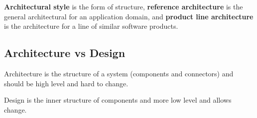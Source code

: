 \documentclass[11pt]{article}
\begin{document}
\textbf{Architectural style} is the form of structure, \textbf{reference architecture} is the general architectural for an application domain, and \textbf{product line architecture} is the architecture for a line of similar software products.
\subsection{Architecture vs Design}
\label{sec:org3cab8ae}
Architecture is the structure of a system (components and connectors) and should be high level and hard to change.

Design is the inner structure of components and more low level and allows change.
\end{document}
